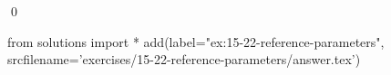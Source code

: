 
\begin{ex}
  \label{ex:15-22-reference-parameters}
  
  \qed
\end{ex}
\begin{python0}
from solutions import *
add(label="ex:15-22-reference-parameters",
    srcfilename='exercises/15-22-reference-parameters/answer.tex')
\end{python0}
